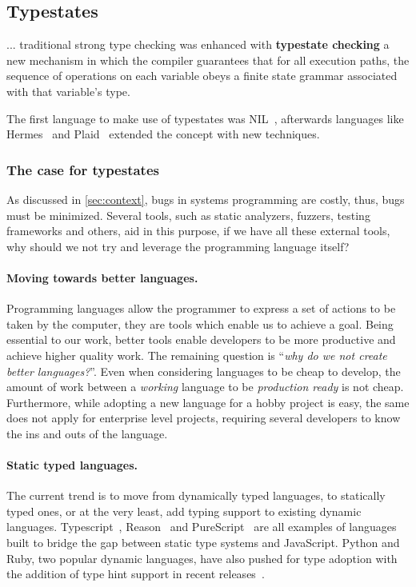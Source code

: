 \subsection{Typestates}\label{sec:typestates}

\begin{displayquote}
    ... traditional strong type checking was enhanced with \textbf{typestate checking}
    a new mechanism in which the compiler guarantees that for all execution paths,
    the sequence of operations on each variable obeys a finite state grammar associated with that variable's type.
\end{displayquote}

The first language to make use of typestates was NIL~\autocite{Strom1983},
afterwards languages like Hermes~\autocite{Strom1990} and Plaid~\autocite{Aldrich2009}
extended the concept with new techniques.

\subsubsection*{The case for typestates}

As discussed in \autoref{sec:context}, bugs in systems programming are costly,
thus, bugs must be minimized.
Several tools, such as static analyzers, fuzzers, testing frameworks and others,
aid in this purpose, if we have all these external tools,
why should we not try and leverage the programming language itself?

\paragraph{Moving towards better languages.}
Programming languages allow the programmer to express a set of actions to be taken by the computer,
they are tools which enable us to achieve a goal.
Being essential to our work, better tools enable developers to be more productive and achieve higher quality work.
The remaining question is “\emph{why do we not create better languages?}”.
Even when considering languages to be cheap to develop,
the amount of work between a \emph{working} language to be \emph{production ready} is not cheap.
Furthermore, while adopting a new language for a hobby project is easy,
the same does not apply for enterprise level projects,
requiring several developers to know the ins and outs of the language.

\paragraph{Static typed languages.}
The current trend is to move from dynamically typed languages,
to statically typed ones, or at the very least, add typing support to existing dynamic languages.
Typescript~\autocite{typescript},
Reason~\autocite{reason} and
PureScript~\autocite{purescript}
are all examples of languages built to bridge the gap between static type systems and JavaScript.
Python and Ruby, two popular dynamic languages, have also pushed for type adoption
with the addition of type hint support in recent
releases~\autocite{PythonTyping, RubyRBS}.

